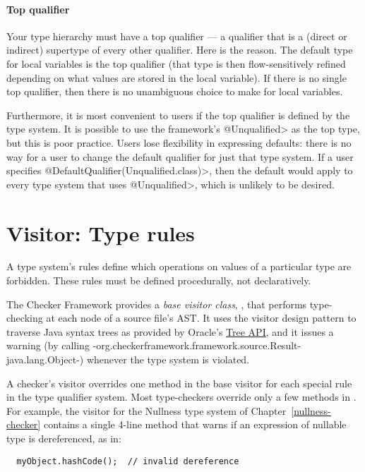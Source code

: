 \paragraph{Top qualifier\label{top-qualifier}}
Your type hierarchy must have a top qualifier
--- a qualifier that is a (direct or indirect) supertype of every other
qualifier.
Here is the reason.
The default type for local variables is the top
qualifier (that type is then flow-sensitively
refined depending on what values are stored in the local variable).
If there is no single top qualifier, then there is no
unambiguous choice to make for local variables.

Furthermore, it is most convenient to users if the top qualifier is defined
by the type system.  It is possible to use the framework's
\<@Unqualified> as the top type, but this is poor practice.
Users lose
flexibility in expressing defaults:  there is no
way for a user to change the default qualifier for just that type system.
If a user specifies
\<@DefaultQualifier(Unqualified.class)>,
then the default would apply to every
type system that uses \<@Unqualified>, which is unlikely to be desired.


\section{Visitor: Type rules\label{extending-visitor}}

A type system's rules define which operations on values of a
particular type are forbidden.
These rules must be defined procedurally, not declaratively.

The Checker Framework provides a \textit{base visitor class},
, that performs type-checking at each node of a
source file's AST\@.  It uses the visitor design pattern to traverse
Java syntax trees as provided by Oracle's
\href{http://docs.oracle.com/javase/8/docs/jdk/api/javac/tree/}{Tree
API},
and it issues a warning (by calling
{-org.checkerframework.framework.source.Result-java.lang.Object-})
whenever the type system is violated.

A checker's visitor overrides one method in the base visitor for each special
rule in the type qualifier system.  Most type-checkers
override only a few methods in .  For example, the
visitor for the Nullness type system of Chapter~\ref{nullness-checker}
contains a single 4-line method that warns if an expression of nullable type
is dereferenced, as in:
\begin{Verbatim}
  myObject.hashCode();  // invalid dereference
\end{Verbatim}



